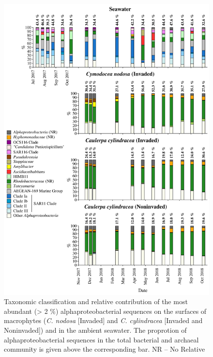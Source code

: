 \documentclass[12pt,]{article}
\begin{document}
\begin{figure}[H]

{\centering \includegraphics[width=0.85\linewidth]{../results/figures/alphaproteobacteria_bar_plot} 

}

\caption{Taxonomic classification and relative contribution of the most abundant (> 2 \si{\percent}) alphaproteobacterial sequences on the surfaces of macrophytes (\textit{C. nodosa} [Invaded] and \textit{C. cylindracea} [Invaded and Noninvaded]) and in the ambient seawater. The proprotion of alphaproteobacterial sequences in the total bacterial and archaeal community is given above the corresponding bar. NR -- No Relative\label{alpha}}\label{fig:unnamed-chunk-7}
\end{figure}
\end{document}
